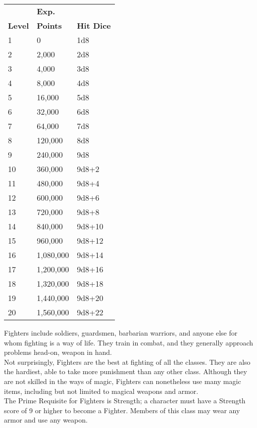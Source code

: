 \documentclass[a4paper,twoside,openany,10pt]{book}
\begin{document}
\begin{multicols}{2}
\begin{tabular*}{0.93\linewidth}{@{\extracolsep{\fill}}lll}
& \textbf{Exp.} & \\
\textbf{Level} & \textbf{Points} & \textbf{Hit Dice} \\\toprule
1 & 0 & 1d8 \\\hline
2 & 2,000 & 2d8 \\\hline
3 & 4,000 & 3d8 \\\hline
4 & 8,000 & 4d8 \\\hline
5 & 16,000 & 5d8 \\\hline
6 & 32,000 & 6d8 \\\hline
7 & 64,000 & 7d8 \\\hline
8 & 120,000 & 8d8 \\\hline
9 & 240,000 & 9d8 \\\hline
10 & 360,000 & 9d8+2 \\\hline
11 & 480,000 & 9d8+4 \\\hline
12 & 600,000 & 9d8+6 \\\hline
13 & 720,000 & 9d8+8 \\\hline
14 & 840,000 & 9d8+10 \\\hline
15 & 960,000 & 9d8+12 \\\hline
16 & 1,080,000 & 9d8+14 \\\hline
17 & 1,200,000 & 9d8+16 \\\hline
18 & 1,320,000 & 9d8+18 \\\hline
19 & 1,440,000 & 9d8+20 \\\hline
20 & 1,560,000 & 9d8+22 \\\bottomrule
\end{tabular*}\medskip


Fighters include soldiers, guardsmen, barbarian warriors, and anyone else for whom fighting is a way of life. They train in combat, and they generally approach problems head-on, weapon in hand.\\

Not surprisingly, Fighters are the best at fighting of all the classes. They are also the hardiest, able to take more punishment than any other class. Although they are not skilled in the ways of magic, Fighters can nonetheless use many magic items, including but not limited to magical weapons and armor.\\

The Prime Requisite for Fighters is Strength; a character must have a Strength score of 9 or higher to become a Fighter. Members of this class may wear any armor and use any weapon.


\end{multicols}
\end{document}
